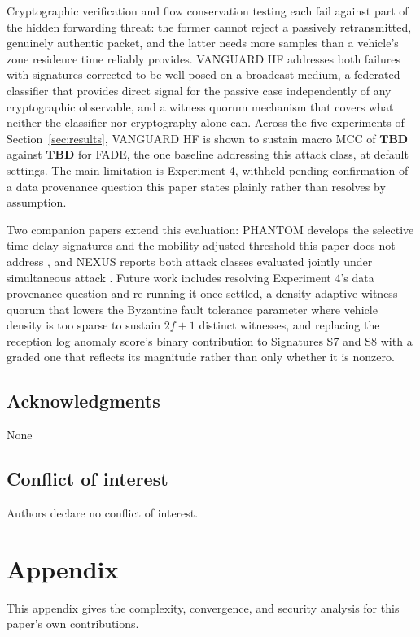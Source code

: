 \documentclass[final,5p,twocolumn]{elsarticle}
\theoremstyle{remark}
\theoremstyle{plain}
\newcommand{\TBD}{\textbf{TBD}} %
\begin{document}
Cryptographic verification and flow conservation testing each fail against
part of the hidden forwarding threat: the former cannot reject a passively
retransmitted, genuinely authentic packet, and the latter needs more
samples than a vehicle's zone residence time reliably provides. VANGUARD HF
addresses both failures with signatures corrected to be well posed on a
broadcast medium, a federated classifier that provides direct signal for
the passive case independently of any cryptographic observable, and a
witness quorum mechanism that covers what neither the classifier nor
cryptography alone can. Across the five experiments of
Section~\ref{sec:results}, VANGUARD HF is shown to sustain macro MCC of
$\TBD$ against $\TBD$ for FADE, the one baseline addressing this attack
class, at default settings. The main limitation is Experiment 4, withheld
pending confirmation of a data provenance question this paper states
plainly rather than resolves by assumption.

Two companion papers extend this evaluation: PHANTOM develops the
selective time delay signatures and the mobility adjusted threshold this
paper does not address \cite{Phantom2026}, and NEXUS reports both attack
classes evaluated jointly under simultaneous attack \cite{Nexus2026}.
Future work includes resolving Experiment 4's data provenance question and
re running it once settled, a density adaptive witness quorum that lowers
the Byzantine fault tolerance parameter where vehicle density is too sparse
to sustain $2f{+}1$ distinct witnesses, and replacing the reception log
anomaly score's binary contribution to Signatures S7 and S8 with a graded
one that reflects its magnitude rather than only whether it is nonzero.

\subsection{Acknowledgments}
\noindent None

\subsection{Conflict of interest}
\noindent Authors declare no conflict of interest.

\section[\appendixname~\thesection]{Appendix}
\label{appendix}

This appendix gives the complexity, convergence, and security analysis for
this paper's own contributions.
\end{document}
